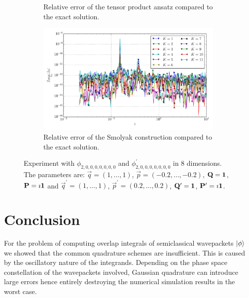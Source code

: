 \documentclass[a4paper,10pt]{article}
\begin{document}
\begin{figure}[ht!]
\begin{subfigure}[t]{0.5\linewidth}
    \caption{Relative error of the tensor product ansatz compared to the exact solution.}
    \label{fig:tp_sg_8d_conv_eps_20000000_20000000_err_rel_nsd_tp}
  \end{subfigure}
  \begin{subfigure}[t]{0.5\linewidth}
    \includegraphics[width=\linewidth]{./plots/tp_sg_8d_conv_eps_(2,0,0,0,0,0,0,0)_(2,0,0,0,0,0,0,0)_err_rel_nsd_gk.pdf}
    \caption{Relative error of the Smolyak construction compared to the exact solution.}
    \label{fig:tp_sg_8d_conv_eps_20000000_20000000_err_rel_nsd_gk}
  \end{subfigure}
  \label{fig:tp_sg_8d_conv_eps_20000000_20000000}
  \caption{Experiment with $\phi_{2,0,0,0,0,0,0,0}$ and $\phi_{2,0,0,0,0,0,0,0}^{\prime}$
  in 8 dimensions.
  The parameters are:
  $\vec{q} = (1, \ldots, 1)$,
  $\vec{p} = (-0.2, \ldots, -0.2)$,
  $\mathbf{Q} = \mathbf{1}$,
  $\mathbf{P} = \imath \mathbf{1}$
  and
  $\vec{q}^\prime = (1, \ldots, 1)$,
  $\vec{p}^\prime = (0.2, \ldots, 0.2)$,
  $\mathbf{Q}^\prime = \mathbf{1}$,
  $\mathbf{P}^\prime = \imath \mathbf{1}$.}
\end{figure}


\FloatBarrier
\section{Conclusion}

For the problem of computing overlap integrals of semiclassical wavepackets $\ket{\phi}$
we showed that the common quadrature schemes are insufficient. This is
caused by the oscillatory nature of the integrands. Depending on the phase space constellation
of the wavepackets involved, Gaussian quadrature can introduce large errors hence entirely
destroying the numerical simulation results in the worst case.
\end{document}
